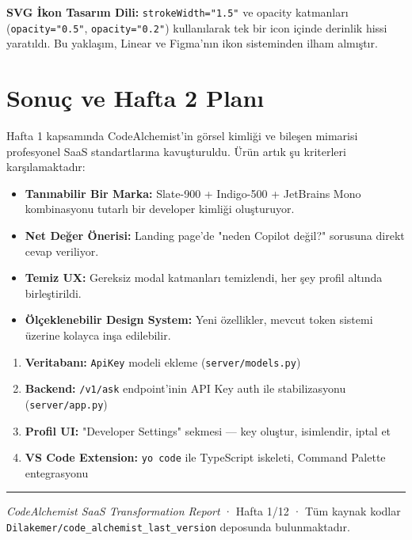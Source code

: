 \documentclass[12pt,a4paper]{article}
\begin{document}
\begin{keypoint}
\textbf{SVG İkon Tasarım Dili:} \texttt{strokeWidth="1.5"} ve opacity katmanları (\texttt{opacity="0.5"}, \texttt{opacity="0.2"}) kullanılarak tek bir icon içinde derinlik hissi yaratıldı. Bu yaklaşım, Linear ve Figma'nın ikon sisteminden ilham almıştır.
\end{keypoint}

\section{Sonuç ve Hafta 2 Planı}

Hafta 1 kapsamında CodeAlchemist'in görsel kimliği ve bileşen mimarisi profesyonel SaaS standartlarına kavuşturuldu. Ürün artık şu kriterleri karşılamaktadır:

\begin{itemize}[noitemsep]
  \item \textbf{Tanınabilir Bir Marka:} Slate-900 + Indigo-500 + JetBrains Mono kombinasyonu tutarlı bir developer kimliği oluşturuyor.
  \item \textbf{Net Değer Önerisi:} Landing page'de "neden Copilot değil?" sorusuna direkt cevap veriliyor.
  \item \textbf{Temiz UX:} Gereksiz modal katmanları temizlendi, her şey profil altında birleştirildi.
  \item \textbf{Ölçeklenebilir Design System:} Yeni özellikler, mevcut token sistemi üzerine kolayca inşa edilebilir.
\end{itemize}

\vspace{1cm}

\begin{changesummary}
\begin{enumerate}[noitemsep]
  \item \textbf{Veritabanı:} \texttt{ApiKey} modeli ekleme (\texttt{server/models.py})
  \item \textbf{Backend:} \texttt{/v1/ask} endpoint'inin API Key auth ile stabilizasyonu (\texttt{server/app.py})
  \item \textbf{Profil UI:} "Developer Settings" sekmesi — key oluştur, isimlendir, iptal et
  \item \textbf{VS Code Extension:} \texttt{yo code} ile TypeScript iskeleti, Command Palette entegrasyonu
\end{enumerate}
\end{changesummary}

\vfill

\noindent\color{slate700}\rule{\textwidth}{0.4pt}
\vspace{4pt}
{\small\color{slate400}
\textit{CodeAlchemist SaaS Transformation Report} · Hafta 1/12 ·
Tüm kaynak kodlar \texttt{Dilakemer/code\_alchemist\_last\_version} deposunda bulunmaktadır.}
\end{document}
